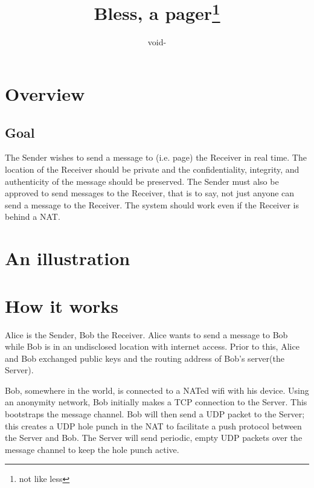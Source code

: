 \documentclass[11pt]{article}
\title{Bless, a pager\footnote{not like less}}
\author{void-}
\begin{document}
\maketitle
\section*{Overview}
\subsection*{Goal}
The Sender wishes to send a message to (i.e. page) the Receiver in real time.
The location of the Receiver should be private and the confidentiality,
integrity, and authenticity of the message should be preserved. The Sender must
also be approved to send messages to the Receiver, that is to say, not just
anyone can send a message to the Receiver. The system should work even if the
Receiver is behind a NAT.

\section*{An illustration}

\section*{How it works}
Alice is the Sender, Bob the Receiver. Alice wants to send a message to Bob
while Bob is in an undisclosed location with internet access. Prior to this,
Alice and Bob exchanged public keys and the routing address of Bob's server(the
Server).

Bob, somewhere in the world, is connected to a NATed wifi with his device.
Using an anonymity network, Bob initially makes a TCP connection to the Server.
This bootstraps the message channel. Bob will then send a UDP packet to the
Server; this creates a UDP hole punch in the NAT to facilitate a push protocol
between the Server and Bob. The Server will send periodic, empty UDP packets
over the message channel to keep the hole punch active.
\end{document}
